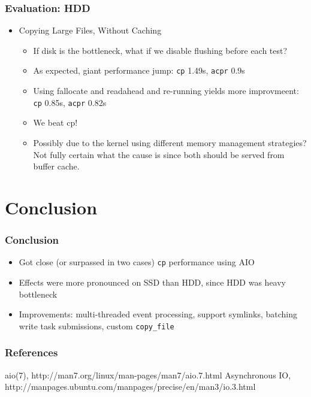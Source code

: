 \documentclass{beamer}
\begin{document}
\begin{frame}
    \frametitle{Evaluation: HDD}
    \begin{itemize}
	\item{Copying Large Files, Without Caching}
	    \begin{itemize}
		\item If disk is the bottleneck, what if we disable flushing before each test?
		\item As expected, giant performance jump: \texttt{cp} 1.49s, \texttt{acpr} 0.9s
		\item Using fallocate and readahead and re-running yields more improvmeent: \texttt{cp} 0.85s, \texttt{acpr} 0.82s
		\item We beat cp!
		\item Possibly due to the kernel using different memory management strategies? Not fully certain what the cause is since both should be served from buffer cache.
	    \end{itemize}
    \end{itemize}
\end{frame}

\section{Conclusion}
\begin{frame}
    \frametitle{Conclusion}
    \begin{itemize}
	\item Got close (or surpassed in two cases) \texttt{cp} performance using AIO
	\item Effects were more pronounced on SSD than HDD, since HDD was heavy bottleneck
	\item Improvements: multi-threaded event processing, support symlinks, batching
	    write task submissions, custom \texttt{copy\_file}
    \end{itemize}
\end{frame}

\begin{frame}
    \frametitle{References}
    \footnotesize{
	\begin{thebibliography}{99}
		aio(7), http://man7.org/linux/man-pages/man7/aio.7.html
		Asynchronous IO, http://manpages.ubuntu.com/manpages/precise/en/man3/io.3.html
	\end{thebibliography}
    }
\end{frame}
\end{document}

